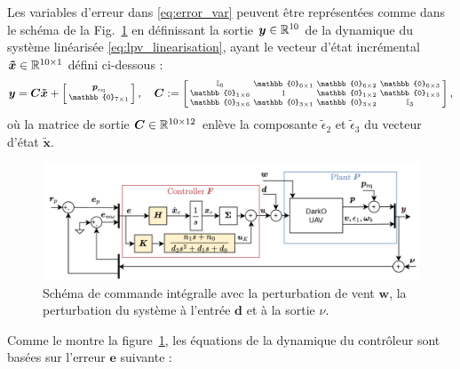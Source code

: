 Les variables d'erreur dans \eqref{eq:error_var} peuvent être représentées comme dans le schéma  de la Fig.~\ref{fig:commande_int6DOF} en définissant la sortie $\boldsymbol{y}\in {\mathbb R}^{10}$ de la dynamique du système linéarisée \eqref{eq:lpv_linearisation}, ayant le vecteur d'état incrémental $\boldsymbol{\tilde{x}} \in {\mathbb R}^{10 \times 1}$ défini ci-dessous : 
\begin{align}
    \label{eq:output_lin}
    \boldsymbol{y} = \boldsymbol{C} \boldsymbol{\tilde{x}} + \smallmat{\boldsymbol{p}_{\mathrm{eq}} \\ \mathbb{0}_{7 \times 1}}, \quad
 \boldsymbol{C} := \smallmat{\mathbb{I}_{6} & \mathbb{0}_{6\times 1} & \mathbb{0}_{6\times 2} &\mathbb{0}_{6\times 3}\\
    \mathbb{0}_{1\times 6} & 1 & \mathbb{0}_{1\times 2} &\mathbb{0}_{1\times 3}\\
    \mathbb{0}_{3\times 6} & \mathbb{0}_{3\times 1} & \mathbb{0}_{3\times 2} &  \mathbb{I}_{3}
},
\end{align}
où la matrice de sortie $\boldsymbol{C} \in {\mathbb R}^{10\times12}$ enlève la composante $\tilde{\epsilon}_{2}$ et $\tilde{\epsilon}_{3}$ du vecteur d'état $\tilde{\boldsymbol{x}}$. 

\begin{figure}[t!]
    \centering
    \includegraphics[width=1\columnwidth]{figures/commande_integrale.png}
    \caption{Schéma de commande intégralle avec la perturbation de vent $\boldsymbol{w}$, la perturbation du système à l'entrée $\boldsymbol{d}$ et à la sortie $\nu$.}
    \label{fig:commande_int6DOF}
\end{figure}

Comme le montre la figure~\ref{fig:commande_int6DOF}, les équations de la dynamique du contrôleur sont basées sur l'erreur $\boldsymbol{e}$ suivante :

